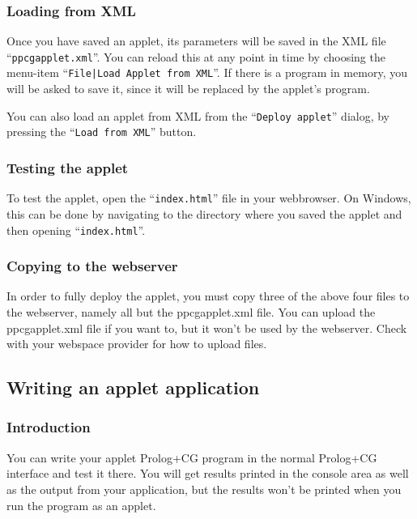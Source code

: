 \documentclass{book}
\begin{document}
\subsubsection{Loading from XML}

Once you have saved an applet, its parameters will be saved in the XML
file ``\texttt{ppcgapplet.xml}''.  You can reload this at any point in
time by choosing the menu-item ``\texttt{File|Load Applet from XML}''.
If there is a program in memory, you will be asked to save it, since
it will be replaced by the applet's program.

You can also load an applet from XML from the ``\texttt{Deploy applet}''
dialog, by pressing the ``\texttt{Load from XML}'' button.

\subsubsection{Testing the applet}

To test the applet, open the ``\texttt{index.html}'' file in your webbrowser.
On Windows, this can be done by navigating to the directory where you
saved the applet and then opening ``\texttt{index.html}''.

\subsubsection{Copying to the webserver}

In order to fully deploy the applet, you must copy three of the
above four files to the webserver, namely all but the ppcgapplet.xml
file.  You can upload the ppcgapplet.xml file if you want to, but it
won't be used by the webserver.  Check with your webspace provider for
how to upload files.


\subsection{Writing an applet application}

\subsubsection{Introduction}

You can write your applet Prolog+CG program in the normal Prolog+CG
interface and test it there.  You will get results printed in the
console area as well as the output from your application, but the
results won't be printed when you run the program as an applet.
\end{document}
